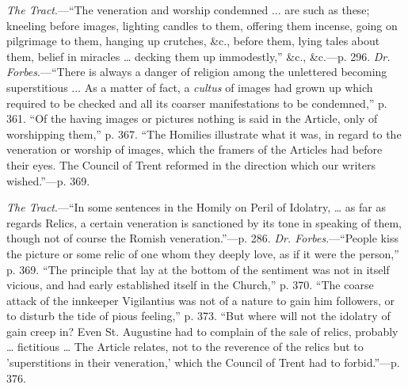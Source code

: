 
\emph{The Tract}.—``The veneration and worship condemned ... are
such as these; kneeling before images, lighting candles to them,
offering them incense, going on pilgrimage to them, hanging up
crutches, \&c., before them, lying tales about them, belief in
miracles … decking them up immodestly,'' \&c., \&c.—p.
296.
\emph{Dr. Forbes}.—``There is always a danger of religion among
the unlettered becoming superstitious ... As a matter of fact, a \emph{cultus}
of images had grown up which required to be checked and all its
coarser manifestations to be condemned,'' p. 361. ``Of the
having images or pictures nothing is said in the Article, only of
worshipping them,'' p. 367. ``The Homilies illustrate what it
was, in regard to the veneration or worship of images, which the
framers of the Articles had before their eyes. The Council of Trent
reformed in the direction which our writers wished.''—p. 369.


\emph{The Tract}.—``In some sentences in the Homily on Peril of
Idolatry, … as far as regards Relics, a certain veneration is
sanctioned by its tone in speaking of them, though not of course the
Romish veneration.''—p. 286.
\emph{Dr. Forbes}.—``People kiss the picture or some relic of
one whom they deeply love, as if it were the person,'' p. 369.
``The principle that lay at the bottom of the sentiment was not in
itself vicious, and had early established itself in the Church,''
p. 370. ``The coarse attack of the innkeeper Vigilantius was not
of a nature to gain him followers, or to disturb the tide of pious
feeling,'' p. 373. ``But where will not the idolatry of gain
creep in? Even St. Augustine had to complain of the sale of relics,
probably … fictitious … The Article relates, not to the
reverence of the relics but to 'superstitions in their veneration,'
which the Council of Trent had to forbid.''—p. 376.


